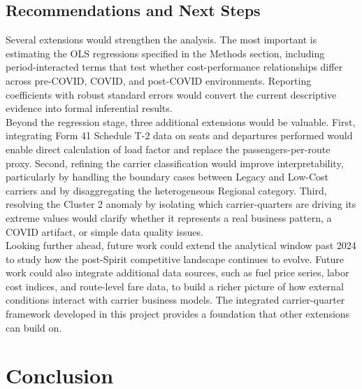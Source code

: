 \documentclass[11pt, letterpaper]{article}
\begin{document}
\subsection{Recommendations and Next Steps}
Several extensions would strengthen the analysis. The most important is estimating the OLS regressions specified in the Methods section, including period-interacted terms that test whether cost-performance relationships differ across pre-COVID, COVID, and post-COVID environments. Reporting coefficients with robust standard errors would convert the current descriptive evidence into formal inferential results.\\
\indent Beyond the regression stage, three additional extensions would be valuable. First, integrating Form 41 Schedule T-2 data on seats and departures performed would enable direct calculation of load factor and replace the passengers-per-route proxy. Second, refining the carrier classification would improve interpretability, particularly by handling the boundary cases between Legacy and Low-Cost carriers and by disaggregating the heterogeneous Regional category. Third, resolving the Cluster 2 anomaly by isolating which carrier-quarters are driving its extreme values would clarify whether it represents a real business pattern, a COVID artifact, or simple data quality issues.\\
\indent Looking further ahead, future work could extend the analytical window past 2024 to study how the post-Spirit competitive landscape continues to evolve. Future work could also integrate additional data sources, such as fuel price series, labor cost indices, and route-level fare data, to build a richer picture of how external conditions interact with carrier business models. The integrated carrier-quarter framework developed in this project provides a foundation that other extensions can build on.


\section{Conclusion}
\end{document}
